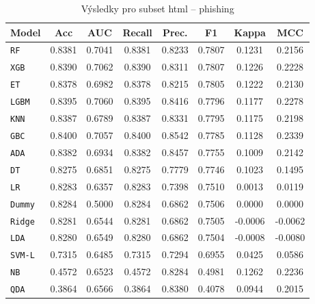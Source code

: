 \begin{table}[H]
  \centering
  \small
  \caption{Výsledky pro subset html – phishing}
  \begin{tabular}{|l|c|c|c|c|c|c|c|}
    \hline
    \textbf{Model} & \textbf{Acc} & \textbf{AUC} & \textbf{Recall} & \textbf{Prec.} & \textbf{F1} & \textbf{Kappa} & \textbf{MCC} \\
    \hline
    \texttt{RF} & 0.8381 & 0.7041 & 0.8381 & 0.8233 & 0.7807 & 0.1231 & 0.2156 \\
    \texttt{XGB} & 0.8390 & 0.7062 & 0.8390 & 0.8311 & 0.7807 & 0.1226 & 0.2228 \\
    \texttt{ET} & 0.8378 & 0.6982 & 0.8378 & 0.8215 & 0.7805 & 0.1222 & 0.2130 \\
    \texttt{LGBM} & 0.8395 & 0.7060 & 0.8395 & 0.8416 & 0.7796 & 0.1177 & 0.2278 \\
    \texttt{KNN} & 0.8387 & 0.6789 & 0.8387 & 0.8331 & 0.7795 & 0.1175 & 0.2198 \\
    \texttt{GBC} & 0.8400 & 0.7057 & 0.8400 & 0.8542 & 0.7785 & 0.1128 & 0.2339 \\
    \texttt{ADA} & 0.8382 & 0.6934 & 0.8382 & 0.8457 & 0.7755 & 0.1009 & 0.2142 \\
    \texttt{DT} & 0.8275 & 0.6851 & 0.8275 & 0.7779 & 0.7746 & 0.1023 & 0.1495 \\
    \texttt{LR} & 0.8283 & 0.6357 & 0.8283 & 0.7398 & 0.7510 & 0.0013 & 0.0119 \\
    \texttt{Dummy} & 0.8284 & 0.5000 & 0.8284 & 0.6862 & 0.7506 & 0.0000 & 0.0000 \\
    \texttt{Ridge} & 0.8281 & 0.6544 & 0.8281 & 0.6862 & 0.7505 & -0.0006 & -0.0062 \\
    \texttt{LDA} & 0.8280 & 0.6549 & 0.8280 & 0.6862 & 0.7504 & -0.0008 & -0.0080 \\
    \texttt{SVM-L} & 0.7315 & 0.6485 & 0.7315 & 0.7294 & 0.6955 & 0.0425 & 0.0586 \\
    \texttt{NB} & 0.4572 & 0.6523 & 0.4572 & 0.8284 & 0.4981 & 0.1262 & 0.2236 \\
    \texttt{QDA} & 0.3864 & 0.6566 & 0.3864 & 0.8380 & 0.4078 & 0.0944 & 0.2015 \\
    \hline
  \end{tabular}
\end{table}
\vspace{0.5cm}

